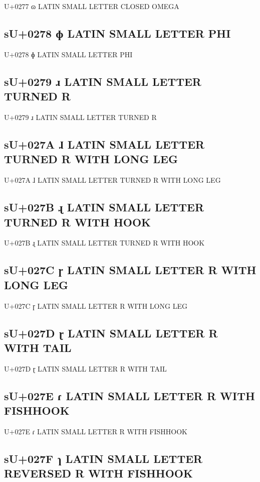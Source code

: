 U+0277 ɷ LATIN SMALL LETTER CLOSED OMEGA

\subsection{sU+0278 ɸ LATIN SMALL LETTER PHI}

U+0278 ɸ LATIN SMALL LETTER PHI

\subsection{sU+0279 ɹ LATIN SMALL LETTER TURNED R}

U+0279 ɹ LATIN SMALL LETTER TURNED R

\subsection{sU+027A ɺ LATIN SMALL LETTER TURNED R WITH LONG LEG}

U+027A ɺ LATIN SMALL LETTER TURNED R WITH LONG LEG

\subsection{sU+027B ɻ LATIN SMALL LETTER TURNED R WITH HOOK}

U+027B ɻ LATIN SMALL LETTER TURNED R WITH HOOK

\subsection{sU+027C ɼ LATIN SMALL LETTER R WITH LONG LEG}

U+027C ɼ LATIN SMALL LETTER R WITH LONG LEG

\subsection{sU+027D ɽ LATIN SMALL LETTER R WITH TAIL}

U+027D ɽ LATIN SMALL LETTER R WITH TAIL

\subsection{sU+027E ɾ LATIN SMALL LETTER R WITH FISHHOOK}

U+027E ɾ LATIN SMALL LETTER R WITH FISHHOOK

\subsection{sU+027F ɿ LATIN SMALL LETTER REVERSED R WITH FISHHOOK}

